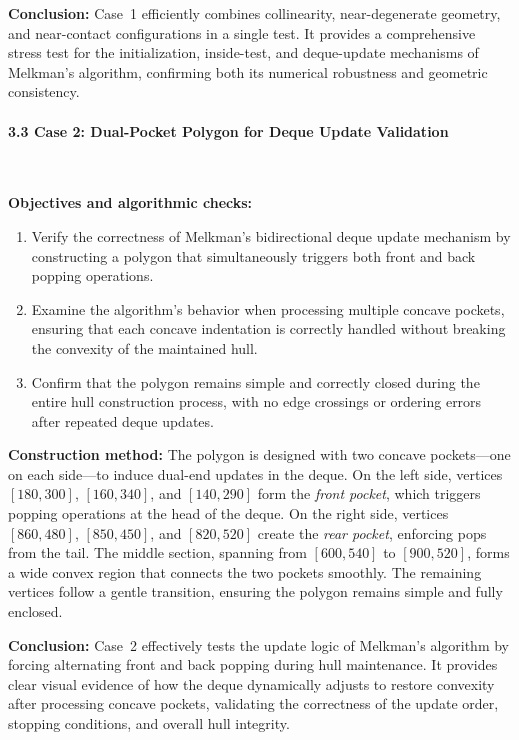 \documentclass{article}
\begin{document}
\textbf{Conclusion:}
Case~1 efficiently combines collinearity, near-degenerate geometry, and near-contact configurations in a single test. 
It provides a comprehensive stress test for the initialization, inside-test, and deque-update mechanisms of Melkman’s algorithm, confirming both its numerical robustness and geometric consistency.

\paragraph{3.3 Case 2: Dual-Pocket Polygon for Deque Update Validation}\

\textbf{Objectives and algorithmic checks:}\

\begin{enumerate}
    \item Verify the correctness of Melkman’s bidirectional deque update mechanism by constructing a polygon that simultaneously triggers both front and back popping operations.
    \item Examine the algorithm’s behavior when processing multiple concave pockets, ensuring that each concave indentation is correctly handled without breaking the convexity of the maintained hull.
    \item Confirm that the polygon remains simple and correctly closed during the entire hull construction process, with no edge crossings or ordering errors after repeated deque updates.
\end{enumerate}

\textbf{Construction method:}
The polygon is designed with two concave pockets—one on each side—to induce dual-end updates in the deque. On the left side, vertices $[180,300]$, $[160,340]$, and $[140,290]$ form the \emph{front pocket}, which triggers popping operations at the head of the deque. On the right side, vertices $[860,480]$, $[850,450]$, and $[820,520]$ create the \emph{rear pocket}, enforcing pops from the tail. The middle section, spanning from $[600,540]$ to $[900,520]$, forms a wide convex region that connects the two pockets smoothly. The remaining vertices follow a gentle transition, ensuring the polygon remains simple and fully enclosed.

\textbf{Conclusion:}
Case~2 effectively tests the update logic of Melkman’s algorithm by forcing alternating front and back popping during hull maintenance. 
It provides clear visual evidence of how the deque dynamically adjusts to restore convexity after processing concave pockets, validating the correctness of the update order, stopping conditions, and overall hull integrity.
\end{document}
